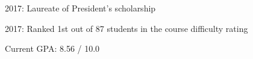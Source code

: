 

\begin{cventries}

\cventry
{} 
{}
{}
{} 
{
 \begin{cvitems}
\item{2017: Laureate of President’s scholarship}
\item {2017: Ranked 1st out of 87 students in the course difficulty rating}
\item {Current GPA: 8.56 / 10.0}
 \end{cvitems}
}

\end{cventries}